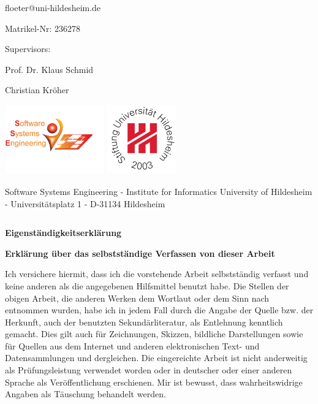 \documentclass[a4paper]{article}
\newcommand\blankpage{%
    \null
    \thispagestyle{empty}%
    \addtocounter{page}{-1}%
    \newpage}
\begin{document}
\begin{center}
floeter@uni-hildesheim.de \par
Matrikel-Nr: 236278 \par
Supervisors: \par
Prof. Dr. Klaus Schmid \par
Christian Kr\"oher \par

\includegraphics[height=3cm,keepaspectratio]{template/logo-left.pdf} \hfill \includegraphics[height=3cm,keepaspectratio]{template/logo-right.pdf} \par
\hspace{8cm}

\scriptsize{Software Systems Engineering - Institute for Informatics University of Hildesheim - Universit\"atsplatz 1 - D-31134 Hildesheim}
\end{center}

\afterpage{\blankpage}

\newpage
\lhead{{}}
\rhead{\leftmark}
\pagestyle{fancy}




\begin{verbatim}
\end{verbatim}
\Large \textbf{Eigenst\"andigkeitserkl\"arung} \normalsize


\textbf{Erkl\"arung \"uber das selbstst\"andige Verfassen von dieser Arbeit}

Ich versichere hiermit, dass ich die vorstehende Arbeit selbstständig verfasst und keine anderen als die angegebenen Hilfsmittel benutzt habe. Die Stellen der obigen Arbeit, die anderen Werken dem Wortlaut oder dem Sinn nach entnommen wurden, habe ich in jedem Fall durch die Angabe der Quelle bzw. der Herkunft, auch der benutzten Sekund\"arliteratur, als Entlehnung kenntlich gemacht. Dies gilt auch f\"ur Zeich\-nun\-gen, Skizzen, bildliche Dar\-stel\-lung\-en sowie f\"ur Quellen aus dem Internet und anderen elektronischen Text- und Datensammlungen und dergleichen. Die eingereichte Arbeit ist nicht anderweitig als Pr\"u\-fungs\-leis\-tung verwendet worden oder in deutscher oder einer anderen Spra\-che als Ver\-\"off\-ent\-lich\-ung erschienen. Mir ist bewusst, dass wahrheitswidrige Angaben als Täu\-schung behandelt werden.
\end{document}
